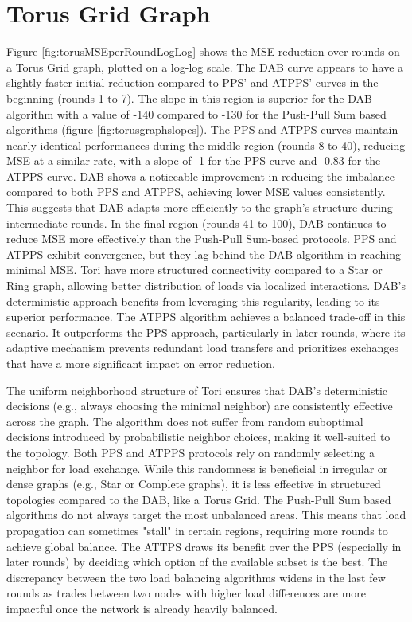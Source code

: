 \section{Torus Grid Graph}\label{sec:torusgridGraph}
Figure \ref{fig:torusMSEperRoundLogLog} shows the MSE reduction over rounds on a Torus Grid graph, plotted on a log-log scale. The DAB curve appears to have a slightly faster initial reduction compared to PPS' and ATPPS' curves in the beginning (rounds 1 to 7). The slope in this region is superior for the DAB algorithm with a value of -140 compared to -130 for the Push-Pull Sum based algorithms (figure \ref{fig:torusgraphslopes}). The PPS and ATPPS curves maintain nearly identical performances during the middle region (rounds 8 to 40), reducing MSE at a similar rate, with a slope of -1 for the PPS curve and -0.83 for the ATPPS curve. DAB shows a noticeable improvement in reducing the imbalance compared to both PPS and ATPPS, achieving lower MSE values consistently. This suggests that DAB adapts more efficiently to the graph's structure during intermediate rounds. In the final region (rounds 41 to 100), DAB continues to reduce MSE more effectively than the Push-Pull Sum-based protocols. PPS and ATPPS exhibit convergence, but they lag behind the DAB algorithm in reaching minimal MSE. Tori have more structured connectivity compared to a Star or Ring graph, allowing better distribution of loads via localized interactions. DAB's deterministic approach benefits from leveraging this regularity, leading to its superior performance. The ATPPS algorithm achieves a balanced trade-off in this scenario. It outperforms the PPS approach, particularly in later rounds, where its adaptive mechanism prevents redundant load transfers and prioritizes exchanges that have a more significant impact on error reduction.

The uniform neighborhood structure of Tori ensures that DAB's deterministic decisions (e.g., always choosing the minimal neighbor) are consistently effective across the graph. The algorithm does not suffer from random suboptimal decisions introduced by probabilistic neighbor choices, making it well-suited to the topology. Both PPS and ATPPS protocols rely on randomly selecting a neighbor for load exchange. While this randomness is beneficial in irregular or dense graphs (e.g., Star or Complete graphs), it is less effective in structured topologies compared to the DAB, like a Torus Grid. The Push-Pull Sum based algorithms do not always target the most unbalanced areas. This means that load propagation can sometimes "stall" in certain regions, requiring more rounds to achieve global balance. The ATTPS draws its benefit over the PPS (especially in later rounds) by deciding which option of the available subset is the best. The discrepancy between the two load balancing algorithms widens in the last few rounds as trades between two nodes with higher load differences are more impactful once the network is already heavily balanced.


